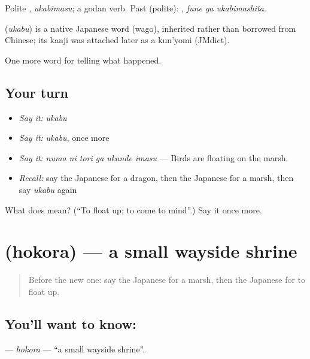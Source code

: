 Polite \textbf{}, \emph{ukabimasu}; a godan verb. Past (polite): \textbf{ }, \emph{fune ga ukabimashita}.

\begin{cousinweb}
\textbf{} (\emph{ukabu}) is a native Japanese word (wago), inherited rather than borrowed from Chinese; its kanji was attached later as a kun'yomi (JMdict).
\end{cousinweb}

\begin{grammarlens}[title={What you've built}]
One more word for telling what happened.
\end{grammarlens}

\subsection*{Your turn}
\begin{itemize}
\raggedright
  \item \emph{Say it:} \emph{ukabu}
  \item \emph{Say it:} \emph{ukabu}, once more
  \item \emph{Say it:} \emph{numa ni tori ga ukande imasu} — Birds are floating on the marsh.
  \item \emph{Recall:} say the Japanese for a dragon, then the Japanese for a marsh, then say \emph{ukabu} again
\end{itemize}

\begin{tcolorbox}[breakable,colback=teal!4,colframe=teal!35!black,title={Before you move on}]
What does  mean? (\textquotedblleft{}To float up; to come to mind\textquotedblright{}.) Say it once more.
\end{tcolorbox}
\section[\texorpdfstring{\ja{ほこら} (hokora)}{ほこら (hokora)}]{ (hokora) — a small wayside shrine}

\label{lesson:JA-C303-hokora}



\begin{quote}
Before the new one: say the Japanese for a marsh, then the Japanese for to float up.
\end{quote}

\subsection*{You'll want to know: }
\textbf{} — \emph{hokora} — \textquotedblleft{}a small wayside shrine\textquotedblright{}.

